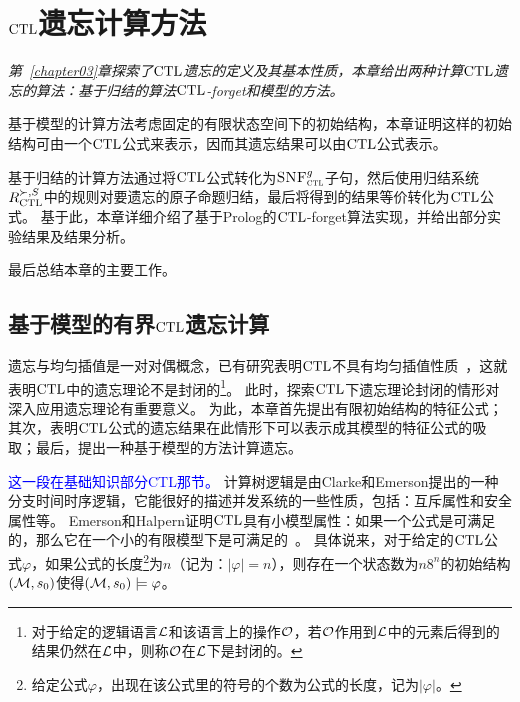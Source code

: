 
\chapter{$\textrm{CTL}$遗忘计算方法}
\label{chapter05}
{\em 第~\ref{chapter03}章探索了$\textrm{CTL}$遗忘的定义及其基本性质，本章给出两种计算$\textrm{CTL}$遗忘的算法：基于归结的算法$\textrm{CTL}$-forget和模型的方法。
	
	基于模型的计算方法考虑固定的有限状态空间下的初始结构，本章证明这样的初始结构可由一个$\textrm{CTL}$公式来表示，因而其遗忘结果可以由$\textrm{CTL}$公式表示。

基于归结的计算方法通过将$\textrm{CTL}$公式转化为${\textsc{SNF}_{\textsc{ctl}}^g}$子句，然后使用归结系统$R_{\textrm{CTL}}^{\succ,S}$中的规则对要遗忘的原子命题归结，最后将得到的结果等价转化为$\textrm{CTL}$公式。
基于此，本章详细介绍了基于Prolog的$\textrm{CTL}$-forget算法实现，并给出部分实验结果及结果分析。

最后总结本章的主要工作。}

\section{基于模型的有界$\textrm{CTL}$遗忘计算}
\label{chapter05:sec:model}
	遗忘与均匀插值是一对对偶概念，已有研究表明$\textrm{CTL}$不具有均匀插值性质~\cite{Maksimova:JANCL:1991}，这就表明$\textrm{CTL}$中的遗忘理论不是封闭的\footnote{对于给定的逻辑语言${\cal L}$和该语言上的操作${\cal O}$，若$\cal O$作用到$\cal L$中的元素后得到的结果仍然在$\cal L$中，则称$\cal O$在$\cal L$下是封闭的。}。
	此时，探索$\textrm{CTL}$下遗忘理论封闭的情形对深入应用遗忘理论有重要意义。
	为此，本章首先提出有限初始结构的特征公式；其次，表明$\textrm{CTL}$公式的遗忘结果在此情形下可以表示成其模型的特征公式的吸取；最后，提出一种基于模型的方法计算遗忘。%



\textcolor{blue}{这一段在基础知识部分CTL那节。} 计算树逻辑是由Clarke和Emerson提出的一种分支时间时序逻辑，它能很好的描述并发系统的一些性质，包括：互斥属性和安全属性等。
Emerson和Halpern证明$\textrm{CTL}$具有小模型属性：如果一个公式是可满足的，那么它在一个小的有限模型下是可满足的~\cite{DBLP:journals/jcss/EmersonH85}。
具体说来，对于给定的$\textrm{CTL}$公式$\varphi$，如果公式的长度\footnote{给定公式$\varphi$，出现在该公式里的符号的个数为公式的长度，记为$|\varphi|$。}为$n$（记为：$|\varphi| = n$），则存在一个状态数为$n8^n$的初始结构$({\cal M},s_0)$使得$({\cal M},s_0)\models \varphi$。

